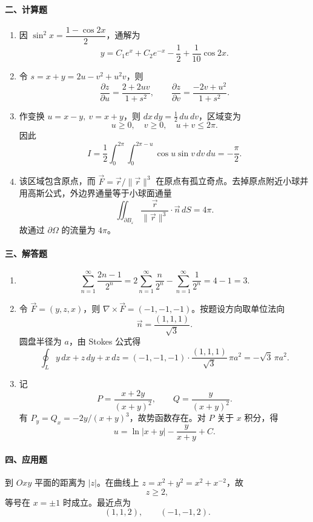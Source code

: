 \paragraph{二、计算题}
\begin{enumerate}
  \item 因 $\sin^2x=\dfrac{1-\cos2x}{2}$，通解为
  \[
    y=C_1e^x+C_2e^{-x}-\frac12+\frac1{10}\cos2x.
  \]
  \item 令 $s=x+y=2u-v^2+u^2v$，则
  \[
    \frac{\partial z}{\partial u}
    =\frac{2+2uv}{1+s^2},\qquad
    \frac{\partial z}{\partial v}
    =\frac{-2v+u^2}{1+s^2}.
  \]
  \item 作变换 $u=x-y,\ v=x+y$，则 $dx\,dy=\frac12\,du\,dv$，区域变为
  \[
    u\ge0,\quad v\ge0,\quad u+v\le2\pi.
  \]
  因此
  \[
    I=\frac12\int_0^{2\pi}\int_0^{2\pi-u}\cos u\sin v\,dv\,du
    =-\frac{\pi}{2}.
  \]
  \item 该区域包含原点，而 $\vec F=\vec r/\|\vec r\|^3$ 在原点有孤立奇点。去掉原点附近小球并用高斯公式，外边界通量等于小球面通量
  \[
    \iint_{\partial B_\varepsilon}\frac{\vec r}{\|\vec r\|^3}\cdot\vec n\,dS=4\pi.
  \]
  故通过 $\partial\Omega$ 的流量为 $4\pi$。
\end{enumerate}

\paragraph{三、解答题}
\begin{enumerate}
  \item
  \[
    \sum_{n=1}^\infty\frac{2n-1}{2^n}
    =2\sum_{n=1}^\infty\frac{n}{2^n}-\sum_{n=1}^\infty\frac1{2^n}
    =4-1=3.
  \]
  \item 令 $\vec F=(y,z,x)$，则 $\nabla\times\vec F=(-1,-1,-1)$。按题设方向取单位法向
  \[
    \vec n=\frac{(1,1,1)}{\sqrt3}.
  \]
  圆盘半径为 $a$，由 Stokes 公式得
  \[
    \oint_L y\,dx+z\,dy+x\,dz
    =(-1,-1,-1)\cdot\frac{(1,1,1)}{\sqrt3}\,\pi a^2
    =-\sqrt3\,\pi a^2.
  \]
  \item 记
  \[
    P=\frac{x+2y}{(x+y)^2},\qquad Q=\frac{y}{(x+y)^2}.
  \]
  有 $P_y=Q_x=-2y/(x+y)^3$，故势函数存在。对 $P$ 关于 $x$ 积分，得
  \[
    u=\ln|x+y|-\frac{y}{x+y}+C.
  \]
\end{enumerate}

\paragraph{四、应用题}
到 $Oxy$ 平面的距离为 $|z|$。在曲线上 $z=x^2+y^2=x^2+x^{-2}$，故
\[
  z\ge2,
\]
等号在 $x=\pm1$ 时成立。最近点为
\[
  (1,1,2),\qquad (-1,-1,2).
\]

